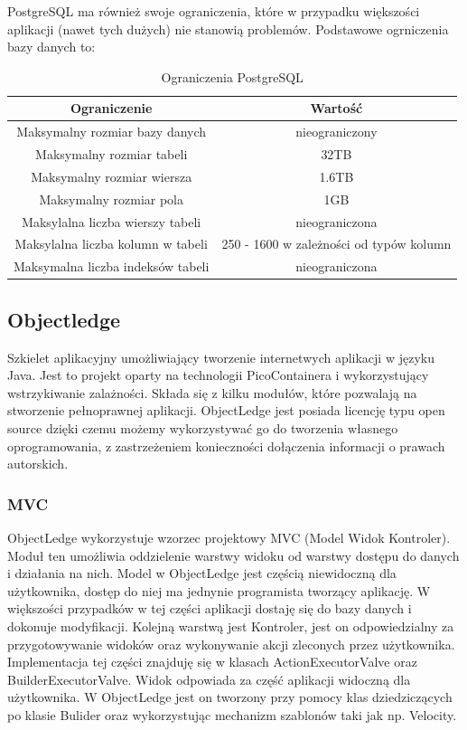 PostgreSQL ma również swoje ograniczenia, które w przypadku większości aplikacji (nawet tych dużych)
nie stanowią problemów. Podstawowe ogrniczenia bazy danych to:
\begin{table}[h]\centering
\caption{Ograniczenia PostgreSQL}
\label{postgresOrganiczeniaTable}
\begin{tabular}{|c||c|}
 \hline \textbf{Ograniczenie} & \textbf{Wartość} \\
 
 \hline
 \hline Maksymalny rozmiar bazy danych & nieograniczony \\
 \hline Maksymalny rozmiar tabeli & 32TB\\
 \hline Maksymalny rozmiar wiersza & 1.6TB\\
 \hline Maksymalny rozmiar pola & 1GB\\
 \hline Maksylalna liczba wierszy tabeli & nieograniczona\\
 \hline Maksylalna liczba kolumn w tabeli & 250 - 1600 w zależności od typów kolumn\\
 \hline Maksymalna liczba indeksów tabeli & nieograniczona\\ 
 \hline
\end{tabular}
\end{table}

\subsection{Objectledge}
Szkielet aplikacyjny umożliwiający tworzenie internetwych aplikacji w języku Java. Jest to projekt 
oparty na technologii PicoContainera i wykorzystujący wstrzykiwanie zalażności. Składa się z kilku 
modułów, które pozwalają na stworzenie pełnoprawnej aplikacji. ObjectLedge jest posiada licencję 
typu open source dzięki czemu możemy wykorzystywać go do tworzenia własnego oprogramowania, z 
zastrzeżeniem konieczności dołączenia informacji o prawach autorskich.
\subsubsection{MVC}
ObjectLedge wykorzystuje wzorzec projektowy MVC (Model Widok Kontroler). Moduł ten umożliwia oddzielenie 
warstwy widoku od warstwy dostępu do danych i działania na nich. Model w ObjectLedge jest częścią 
niewidoczną dla użytkownika, dostęp do niej ma jednynie programista tworzący aplikację. W większości 
przypadków w tej części aplikacji dostaję się do bazy danych i dokonuje modyfikacji. Kolejną warstwą 
jest Kontroler, jest on odpowiedzialny za przygotowywanie widoków oraz wykonywanie akcji zleconych 
przez użytkownika. Implementacja tej części znajduję się w klasach ActionExecutorValve oraz 
BuilderExecutorValve. Widok odpowiada za część aplikacji widoczną dla użytkownika. W ObjectLedge
jest on tworzony przy pomocy klas dziedziczących po klasie Bulider oraz wykorzystując mechanizm szablonów
taki jak np. Velocity.

